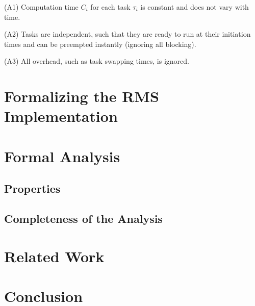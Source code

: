 \documentclass{llncs}
\begin{document}
(A1) Computation time $C_i$ for each task $\tau_i$ is constant and
does not vary with time.

(A2) Tasks are independent, such that they are ready to run at their
initiation times and can be preempted instantly (ignoring all
blocking).

(A3) All overhead, such as task swapping times, is ignored.


\section{Formalizing the RMS Implementation}

\section{Formal Analysis}
\subsection{Properties}
\subsection{Completeness of the Analysis}

\section{Related Work}

\section{Conclusion}
\end{document}

